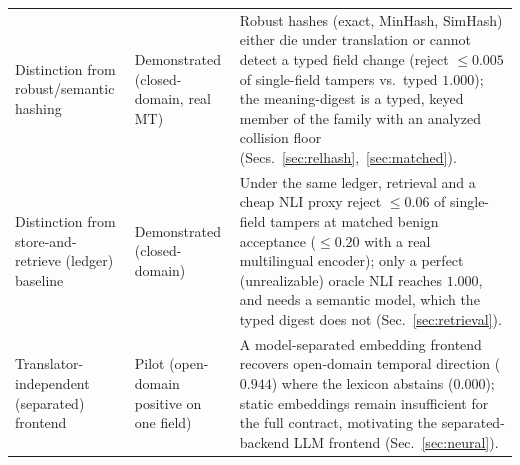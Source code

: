 \documentclass[11pt]{article}
\begin{document}
\begin{table}[t]
\begin{tabularx}{\textwidth}{@{}>{\raggedright\arraybackslash}p{3.1cm}>{\raggedright\arraybackslash}p{3.0cm}X@{}}
Distinction from robust/semantic hashing & Demonstrated (closed-domain, real MT) & Robust hashes (exact, MinHash, SimHash) either die under translation or cannot detect a typed field change (reject $\le0.005$ of single-field tampers vs.\ typed $1.000$); the meaning-digest is a typed, keyed member of the family with an analyzed collision floor (Secs.~\ref{sec:relhash},~\ref{sec:matched}). \\
Distinction from store-and-retrieve (ledger) baseline & Demonstrated (closed-domain) & Under the same ledger, retrieval and a cheap NLI proxy reject $\le0.06$ of single-field tampers at matched benign acceptance ($\le0.20$ with a real multilingual encoder); only a perfect (unrealizable) oracle NLI reaches $1.000$, and needs a semantic model, which the typed digest does not (Sec.~\ref{sec:retrieval}). \\
Translator-independent (separated) frontend & Pilot (open-domain positive on one field) & A model-separated embedding frontend recovers open-domain temporal direction ($0.944$) where the lexicon abstains ($0.000$); static embeddings remain insufficient for the full contract, motivating the separated-backend LLM frontend (Sec.~\ref{sec:neural}). \\
\bottomrule
\end{tabularx}
\end{table}
\end{document}
